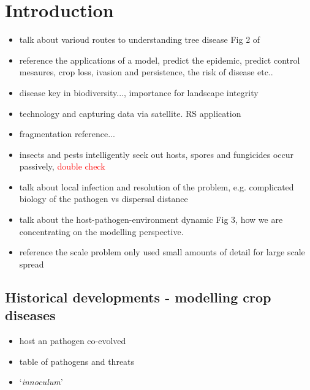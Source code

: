 
\chapter{Introduction} %

\begin{itemize}
    \item talk about varioud routes to understanding tree disease Fig 2 of \cite{pub.1012384986} \cite{francl2001disease}
    \item reference the applications of a model, predict the epidemic, predict control mesaures, crop loss, ivasion and persistence, the risk of disease etc..
    \item \cite{disease-biodiversity} disease key in biodiversity..., \cite{JOHNSON2002129} importance for landscape integrity
    \item \cite{kelly2002monitoring} technology and capturing data via satellite. RS application \cite{doi:10.1094/PHYTO.2003.93.12.1524} \cite{doi:10.1080/0143116031000139926}
    \item \cite{doi:10.1046/j.1523-1739.1994.08010256.x} fragmentation reference...
    \item insects and pests intelligently seek out hosts, spores and fungicides occur passively, \textcolor{red}{double check}
    \item talk about local infection and resolution of the problem, e.g. complicated biology of the pathogen vs dispersal distance
    \item talk about the host-pathogen-environment dynamic \cite{pub.1012384986} Fig 3, how we are concentrating on the modelling perspective.
    \item reference the scale problem \cite{van1999pandemics} only used small amounts of detail for large scale spread
\end{itemize}


\section{Historical developments - modelling crop diseases }
\label{chapter:lit-rev}
\begin{itemize}
    \item host an pathogen co-evolved
    \item table of pathogens and threats
    \item `\textit{innoculum}'
\end{itemize}

